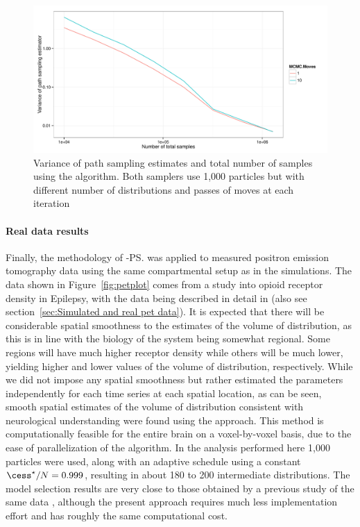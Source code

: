 \begin{figure}[t]
  \includegraphics[width=\linewidth]{fig/MCMC_Iter_Var}
  \caption[Variance of path sampling estimator and total number of samples
  using \protect\smc algorithm]
  {Variance of path sampling estimates and total number of samples
    using the \smc[2] algorithm. Both samplers use 1,000 particles but with
    different number of distributions and passes of \mcmc moves at each
    iteration}
  \label{fig:fast mcmc iter}
\end{figure}

\paragraph{Real data results}

Finally, the methodology of \smc[2]-\ps was applied to measured positron
emission tomography data using the same compartmental setup as in the
simulations. The data shown in Figure~\ref{fig:petplot} comes from a study
into opioid receptor density in Epilepsy, with the data being described in
detail in \cite{Jiang:2009kf} (also see section~\ref{sec:Simulated and real
  pet data}). It is expected that there will be considerable spatial
smoothness to the estimates of the volume of distribution, as this is in line
with the biology of the system being somewhat regional. Some regions will have
much higher receptor density while others will be much lower, yielding higher
and lower values of the volume of distribution, respectively.  While we did
not impose any spatial smoothness but rather estimated the parameters
independently for each time series at each spatial location, as can be seen,
smooth spatial estimates of the volume of distribution consistent with
neurological understanding were found using the approach. This method is
computationally feasible for the entire brain on a voxel-by-voxel basis, due
to the ease of parallelization of the \smc algorithm. In the analysis
performed here 1,000 particles were used, along with an adaptive schedule
using a constant $\cess^\star/N = 0.999$, resulting in about 180 to 200
intermediate distributions. The model selection results are very close to
those obtained by a  previous study of the same data \cite{Zhou2013}, although
the present approach requires much less implementation effort and has roughly
the same computational cost.

